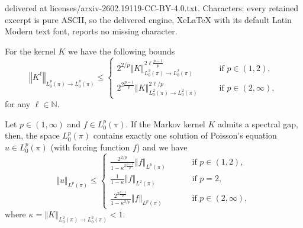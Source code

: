 \documentclass[10pt,a4paper]{amsart}
\newcommand{\N}{\mathbb{N}}
\newcommand{\norm}[1]{\left\Vert #1 \right\Vert}
\begin{document}
delivered at licenses/arxiv-2602.19119-CC-BY-4.0.txt. Characters: every retained excerpt is pure ASCII, so the delivered engine, XeLaTeX with its default Latin Modern text font, reports no missing character.
\begin{lem}\label{lem:spectral_gap_implies_L_p_bound}
For the kernel $K$ we have the following bounds
\[
\norm{K^\ell}_{L^p_0(\pi) \to L^p_0(\pi)} \leq 
\begin{cases}
	2^{2/p} \norm{K}_{L^2_0(\pi) \to L^2_0(\pi)}^{2\ell \frac{p-1}{p}} \qquad &\text{ if } p\in (1,2),\\[1.2ex]
	2^{2\frac{p-1}{p}} \norm{K}_{L^2_0(\pi) \to L^2_0(\pi)}^{2\ell/p} &\text{ if } p \in (2,\infty),
\end{cases}
\]
for any  $\ell \in \N$. 
\end{lem} 

\begin{thm}\label{thm:poisson_equation_spectral_gap_general}
Let $p \in (1,\infty)$ and $f \in L^p_0(\pi)$. 
If the Markov kernel $K$ admits a spectral gap, then, the space $L^p_0(\pi)$ contains exactly one solution of Poisson's equation $u \in L^p_0(\pi)$ (with forcing function $f$) and we have 
\[
\norm{u}_{L^p(\pi)}
\leq 
\begin{cases}
	\frac{2^{2/p}}{1- \kappa^{2\frac{p-1}{p}}} \norm{f}_{L^p(\pi)} \qquad&\text{ if } p \in (1,2), \\[1.5ex]
	\frac{1}{1-\kappa} \norm{f}_{L^2(\pi)} &\text{ if } p = 2, \\[1.2ex]
	\frac{2^{2\frac{p-1}{p}}}{1-\kappa^{2/p}}\norm{f}_{L^p(\pi)} &\text{ if } p\in (2, \infty),
\end{cases}
\] 
where $\kappa = \norm{K}_{L^2_0(\pi) \to L^2_0(\pi)}< 1$. 
\end{thm}
\end{document}
